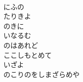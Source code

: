 \documentclass[10pt,b5j]{tarticle} %
\begin{document}
\begin{enumerate}
\begin{minipage}[c]{\blocksize}
        \vspace{\linespace}
        \item~\\
        にふの\\
        たりきよ\\
        のきに\\
        いなるむ\\
        のはあれど\\
        ここしもとめて\\
        いざよ\\
        のこりのをしまざらめや
    
    \end{minipage}
\end{enumerate} %
\end{document}
